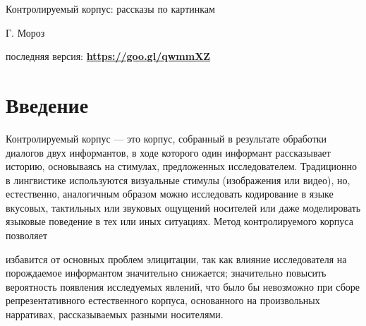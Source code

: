 

\begin{center}{\Large Контролируемый корпус: рассказы по картинкам}
\end{center}
\begin{flushright}
	{\footnotesize Г. Мороз}
\end{flushright}
{\noindent\footnotesize последняя версия: \textbf{\href{https://goo.gl/qwmmXZ}{https://goo.gl/qwmmXZ}}}
\vspace{5mm}
\section{Введение}
\noindent Контролируемый корпус --- это корпус, собранный в результате обработки диалогов двух информантов, в ходе которого один информант рассказывает историю, основываясь на стимулах, предложенных исследователем. Традиционно в лингвистике используются визуальные стимулы (изображения или видео), но, естественно, аналогичным образом можно исследовать кодирование в языке вкусовых, тактильных или звуковых ощущений носителей или даже моделировать языковые поведение в тех или иных ситуациях. Метод контролируемого корпуса позволяет
\begin{itemize}
\mytem  избавится от основных проблем элицитации, так как влияние исследователя на порождаемое информантом значительно снижается;
\mytem значительно повысить вероятность появления исследуемых явлений, что было бы невозможно при сборе репрезентативного естественного корпуса, основанного на произвольных нарративах, рассказываемых разными носителями.
\end{itemize}
